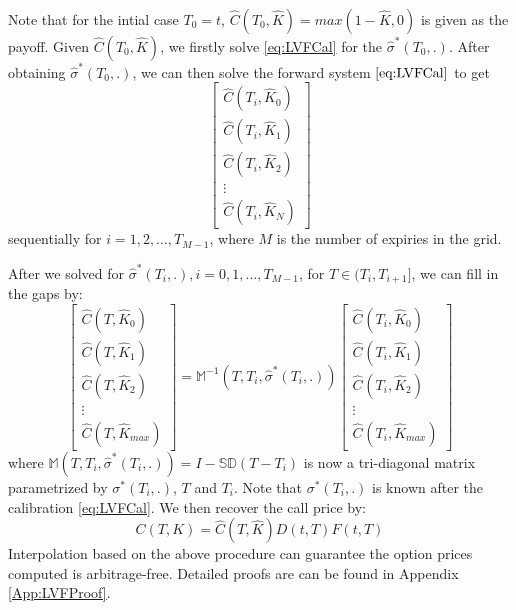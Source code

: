 \documentclass[letterpaper,12pt,titlepage,oneside,final]{book}
\numberwithin{equation}{section}
\theoremstyle{definition}
\begin{document}
Note that for the intial case $T_0=t$, $\widehat{C}(T_0,\widehat{K})=max(1-\widehat{K},0)$ is given as the payoff. Given $\widehat{C}(T_0,\widehat{K})$, we firstly solve \eqref{eq:LVFCal} for the $\widehat{\sigma}^*(T_0,.).$ After obtaining $\widehat{\sigma}^*(T_0,.)$, we can then solve the forward system  $\eqref{eq:LVFCal}$ to get \[
	\begin{bmatrix}
		\widehat{C}(T_i,\widehat{K}_0)\\
		\widehat{C}(T_i,\widehat{K}_1)\\
		\widehat{C}(T_i,\widehat{K}_2)\\
		\vdots\\
		\widehat{C}(T_i,\widehat{K}_{N})
		\end{bmatrix}
\] sequentially for $i=1,2,\dots,T_{M-1}$, where $M$ is the number of expiries in the grid.




After we solved for  $\widehat{\sigma}^*(T_i,.), i=0,1,\dots,T_{M-1}$, for $T \in (T_i,T_{i+1}]$, we can fill in the gaps by:
	\begin{equation}
	\begin{bmatrix}
	\widehat{C}(T,\widehat{K}_0)\\
	\widehat{C}(T,\widehat{K}_1)\\
	\widehat{C}(T,\widehat{K}_2)\\
	\vdots\\
	\widehat{C}(T,\widehat{K}_{max})
	\end{bmatrix}=\mathcal{\mathbb{M}}^{-1} (T,T_{i}, \widehat{\sigma}^*(T_i,.))\begin{bmatrix}
		\widehat{C}_{}(T_{i},\widehat{K}_0)\\
		\widehat{C}_{}(T_{i},\widehat{K}_1)\\
		\widehat{C}_{}(T_{i},\widehat{K}_2)\\
		\vdots\\
		\widehat{C}_{}(T_{i},\widehat{K}_{max})
		\end{bmatrix}
		\label{eq:LVFFill}
	\end{equation}
where $\mathcal{\mathbb{M}} (T,T_{i}, \widehat{\sigma}^*(T_i,.))=I-\mathcal{\mathbb{S}}\mathcal{\mathbb{D}}(T-T_i)$ is now a tri-diagonal matrix parametrized by  $\sigma^*(T_i,.)$, $T$ and $T_i$. Note that $\sigma^*(T_i,.)$ is known after the calibration \eqref{eq:LVFCal}.
We then recover the call price by:
\[
C(T,K)=\widehat{C}(T,\widehat{K}){D(t,T)F(t,T)}
\]
Interpolation based on the above procedure can guarantee the option prices computed is arbitrage-free. Detailed proofs are can be found in Appendix \ref{App:LVFProof}.
\end{document}
